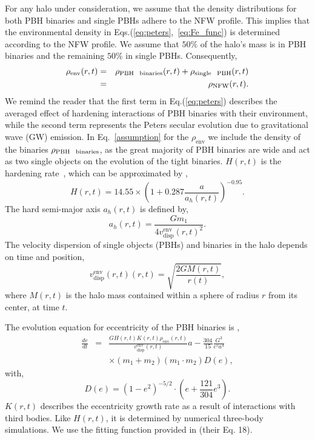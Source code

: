 \documentclass[aps, prd, reprint, nofootinbib]{revtex4-2}
\begin{document}
For any halo under consideration, we assume that the density distributions for both PBH binaries and single PBHs adhere to the NFW profile. This implies that the environmental density in Eqs.(\ref{eq:peters},~\ref{eq:Fe_func}) is determined according to the NFW profile.
We assume that $50\%$ of the halo's mass is in PBH binaries and the remaining $50\%$ in single PBHs. 
Consequently, 
\begin{eqnarray}\label{assumption}
\rho_{\textrm{env}}(r,t) &=&  \rho_{\textrm{PBH \, binaries}}(r,t) + \rho_{\textrm{single \, PBH}}(r,t) \nonumber \\
&=& \rho_{\textrm{NFW}}(r,t).
\end{eqnarray}
We remind the reader that the first term in Eq.(\ref{eq:peters}) describes the averaged effect of hardening interactions of PBH binaries with their environment, while the second term represents the Peters secular evolution due to gravitational wave (GW) emission. 
In Eq.~\ref{assumption} for the $\rho_{\textrm{env}}$ we include the density of the binaries $\rho_{\textrm{PBH \, binaries}}$, as the great majority of PBH binaries are wide and act as two single objects on the evolution of the tight binaries.
$H(r,t)$ is the hardening rate~\cite{H_rate}, which can be approximated by \cite{H_approx},
\begin{equation}
H(r,t)=14.55 \times\left(1+0.287 \frac{a}{a_h(r,t)}\right)^{-0.95}.
\end{equation}
The hard semi-major axis $a_h(r,t)$ is defined by,
\begin{equation}
a_h(r,t)=\frac{G m_{1}}{4 v_{\textrm{disp}}^{\textrm{env}}(r,t)^{2}}.
\end{equation}
The velocity dispersion of single objects (PBHs) and binaries in the halo depends on time and position,
\begin{equation}
v_{\textrm{disp}}^{\textrm{env}}(r,t)
(r,t)=\sqrt{\frac{2 G M(r,t)}{r(t)}},
\end{equation}
where $M(r,t)$ is the halo mass contained within a sphere of radius $r$ from its center, at time $t$. 

The evolution equation for eccentricity of the PBH binaries is \cite{Peters},
\begin{eqnarray}
\label{eq:ecc}
 \frac{de}{dt}&=&\frac{G H(r,t) K(r,t) \rho_{\textrm{env}}(r,t)}{v_{\textrm{disp}}^{\textrm{env}}(r,t)} a-\frac{304}{15} \frac{G^3}{c^5 a^4}     \nonumber \\
&&\times \left(m_1+m_2\right)\left(m_1 \cdot m_2\right) D(e),
\end{eqnarray}
with,
\begin{equation}
D(e)=\left(1-e^2\right)^{-5 / 2} \cdot\left(e+\frac{121}{304} e^3\right).
\end{equation}
$K(r,t)$ describes the eccentricity growth rate as a result of interactions with third bodies. Like $H(r,t)$, it is determined by numerical three-body simulations. We use the fitting function provided in \cite{H_approx} (their Eq. 18). 
\end{document}
